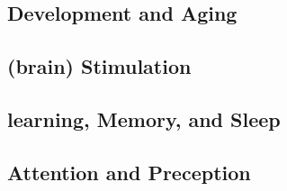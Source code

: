         \subsection*{Development and Aging } 
          \vspace*{1cm}
        
        \subsection*{(brain) Stimulation} 
         \vspace*{1cm}
        
        \subsection*{learning, Memory, and Sleep} 
          \vspace*{1cm}
        
        \subsection*{Attention and Preception} 
         \vspace*{1cm}
        
        